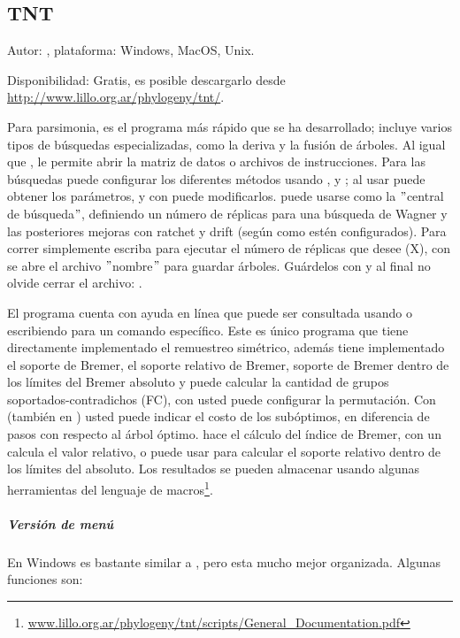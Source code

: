 \subsection{TNT}
\noindent
Autor: \cite{tnt}, plataforma: Windows, MacOS, Unix.

Disponibilidad: Gratis, es posible descargarlo desde \url{http://www.lillo.org.ar/phylogeny/tnt/}.

Para parsimonia, es el programa m\'as r\'apido que se ha desarrollado; incluye varios tipos de b\'usquedas especializadas, como la deriva y la fusi\'on de \'arboles.
Al igual que ,  le permite abrir la matriz de datos o archivos de instrucciones. Para las b\'usquedas puede configurar los diferentes m\'etodos usando ,  y ; al usar  puede obtener los par\'ametros, y con \cmd{=} puede modificarlos.
 puede usarse como la $"$central de b\'usqueda$"$, definiendo un n\'umero de r\'eplicas para una b\'usqueda de Wagner y las posteriores mejoras con ratchet y drift (seg\'un como est\'en configurados). Para correr simplemente escriba  para ejecutar el n\'umero de r\'eplicas que desee (X), con  se abre el archivo $"$nombre$"$ para guardar \'arboles. Gu\'ardelos con  y al final no olvide cerrar el archivo: .

El programa cuenta con ayuda en l\'inea que puede ser consultada usando  o escribiendo  para un comando espec\'ifico. Este es \'unico programa que tiene directamente implementado el remuestreo sim\'etrico, adem\'as tiene implementado el soporte de Bremer, el soporte relativo de Bremer, soporte de Bremer dentro de los l\'imites del Bremer absoluto y puede calcular la cantidad de grupos soportados-contradichos (FC), con  usted puede configurar la permutaci\'on. Con  (tambi\'en en ) usted puede indicar el costo de los sub\'optimos, en diferencia de pasos con respecto al \'arbol \'optimo.  hace el c\'alculo del \'indice de Bremer, con un \cmd{*} calcula el valor relativo, o puede usar \cmd{Bsupport ]} para calcular el soporte relativo dentro de los l\'imites del absoluto. Los resultados se pueden almacenar usando algunas herramientas del lenguaje de macros\footnote{\url{www.lillo.org.ar/phylogeny/tnt/scripts/General_Documentation.pdf}}.


\subparagraph*{Versi\'on de men\'u}
En  Windows es bastante similar a , pero esta mucho mejor organizada. Algunas funciones son:

